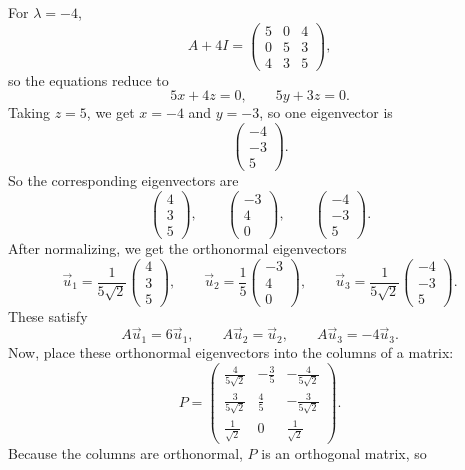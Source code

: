 \documentclass[10pt]{extarticle}
\begin{document}
\begin{enumerate}[label=(\alph*)]
For $\lambda=-4$,
\[
A+4I=
\begin{pmatrix}
5 & 0 & 4\\
0 & 5 & 3\\
4 & 3 & 5
\end{pmatrix},
\]
so the equations reduce to
\[
5x+4z=0,
\qquad
5y+3z=0.
\]
Taking $z=5$, we get $x=-4$ and $y=-3$, so one eigenvector is
\[
\begin{pmatrix}
-4\\-3\\5
\end{pmatrix}.
\]
So the corresponding eigenvectors are
\[
\begin{pmatrix}
4\\3\\5
\end{pmatrix},
\qquad
\begin{pmatrix}
-3\\4\\0
\end{pmatrix},
\qquad
\begin{pmatrix}
-4\\-3\\5
\end{pmatrix}.
\]
After normalizing, we get the orthonormal eigenvectors
\[
\vec{u}_1=\frac{1}{5\sqrt{2}}
\begin{pmatrix}
4\\3\\5
\end{pmatrix},
\qquad
\vec{u}_2=\frac{1}{5}
\begin{pmatrix}
-3\\4\\0
\end{pmatrix},
\qquad
\vec{u}_3=\frac{1}{5\sqrt{2}}
\begin{pmatrix}
-4\\-3\\5
\end{pmatrix}.
\]
These satisfy
\[
A\vec{u}_1=6\vec{u}_1,
\qquad
A\vec{u}_2=\vec{u}_2,
\qquad
A\vec{u}_3=-4\vec{u}_3.
\]
Now, place these orthonormal eigenvectors into the columns of a matrix:
\[
P=
\begin{pmatrix}
\frac{4}{5\sqrt{2}} & -\frac{3}{5} & -\frac{4}{5\sqrt{2}}\\[0.6em]
\frac{3}{5\sqrt{2}} & \frac{4}{5} & -\frac{3}{5\sqrt{2}}\\[0.6em]
\frac{1}{\sqrt{2}} & 0 & \frac{1}{\sqrt{2}}
\end{pmatrix}.
\]
Because the columns are orthonormal, $P$ is an orthogonal matrix, so

\end{enumerate}
\end{document}

